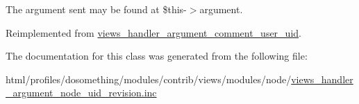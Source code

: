 The argument sent may be found at \$this-\/$>$argument. 

Reimplemented from \hyperlink{classviews__handler__argument__comment__user__uid_a6c3118256c6d2c60167d289c947d31c6}{views\_\-handler\_\-argument\_\-comment\_\-user\_\-uid}.

The documentation for this class was generated from the following file:\begin{DoxyCompactItemize}
\item 
html/profiles/dosomething/modules/contrib/views/modules/node/\hyperlink{views__handler__argument__node__uid__revision_8inc}{views\_\-handler\_\-argument\_\-node\_\-uid\_\-revision.inc}\end{DoxyCompactItemize}
